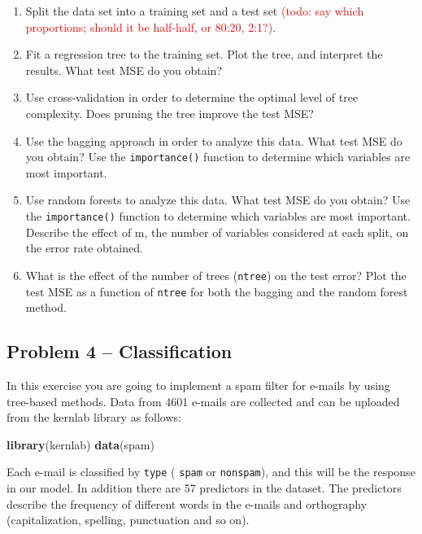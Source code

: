 \documentclass[]{article}
\newenvironment{Shaded}{\begin{snugshade}}{\end{snugshade}}
\newcommand{\KeywordTok}[1]{\textcolor[rgb]{0.13,0.29,0.53}{\textbf{#1}}}
\newcommand{\NormalTok}[1]{#1}
\begin{document}
\begin{enumerate}
\def\labelenumi{\alph{enumi})}
\item
  Split the data set into a training set and a test set
  \textcolor{red}{(todo: say which proportions; should it be half-half, or 80:20, 2:1?)}.
\item
  Fit a regression tree to the training set. Plot the tree, and
  interpret the results. What test MSE do you obtain?
\item
  Use cross-validation in order to determine the optimal level of tree
  complexity. Does pruning the tree improve the test MSE?
\item
  Use the bagging approach in order to analyze this data. What test MSE
  do you obtain? Use the \texttt{importance()} function to determine
  which variables are most important.
\item
  Use random forests to analyze this data. What test MSE do you obtain?
  Use the \texttt{importance()} function to determine which variables
  are most important. Describe the effect of m, the number of variables
  considered at each split, on the error rate obtained.
\item
  What is the effect of the number of trees (\texttt{ntree}) on the test
  error? Plot the test MSE as a function of \texttt{ntree} for both the
  bagging and the random forest method.
\end{enumerate}

\subsection{Problem 4 -- Classification}\label{problem-4-classification}

In this exercise you are going to implement a spam filter for e-mails by
using tree-based methods. Data from 4601 e-mails are collected and can
be uploaded from the kernlab library as follows:

\begin{Shaded}
\begin{Highlighting}[]
\KeywordTok{library}\NormalTok{(kernlab)}
\KeywordTok{data}\NormalTok{(spam)}
\end{Highlighting}
\end{Shaded}

Each e-mail is classified by \texttt{type} ( \texttt{spam} or
\texttt{nonspam}), and this will be the response in our model. In
addition there are 57 predictors in the dataset. The predictors describe
the frequency of different words in the e-mails and orthography
(capitalization, spelling, punctuation and so on).
\end{document}
